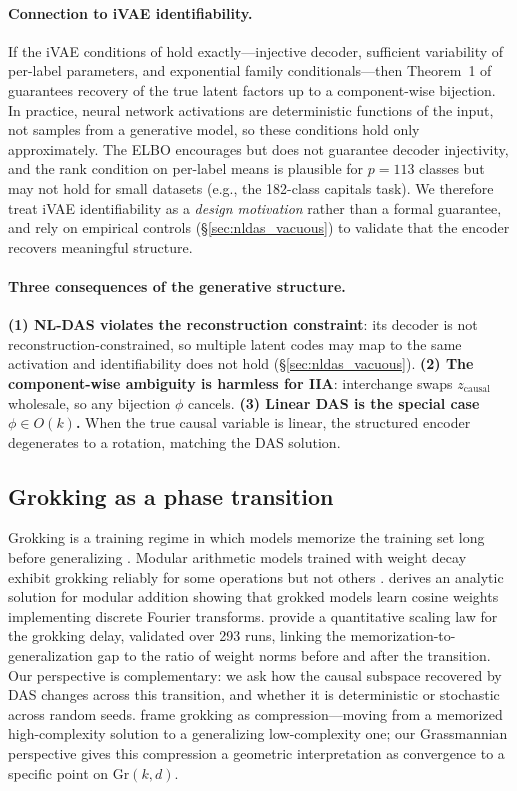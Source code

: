 \documentclass{article}
\newcommand{\Gr}{\mathrm{Gr}}
\begin{document}
\paragraph{Connection to iVAE identifiability.}
\label{prop:recovery}
If the iVAE conditions of \citet{khemakhem2020variational} hold exactly---injective
decoder, sufficient variability of per-label parameters, and exponential family
conditionals---then Theorem~1 of \citet{khemakhem2020variational} guarantees
recovery of the true latent factors up to a component-wise bijection. In
practice, neural network activations are deterministic functions of the input,
not samples from a generative model, so these conditions hold only
approximately. The ELBO encourages but does not guarantee decoder injectivity,
and the rank condition on per-label means is plausible for $p = 113$ classes
but may not hold for small datasets (e.g., the 182-class capitals task).
We therefore treat iVAE identifiability as a \emph{design motivation} rather
than a formal guarantee, and rely on empirical controls
(\S\ref{sec:nldas_vacuous}) to validate that the encoder recovers
meaningful structure.

\paragraph{Three consequences of the generative structure.}
\textbf{(1) NL-DAS violates the reconstruction constraint}:
its decoder is not reconstruction-constrained, so multiple latent codes may
map to the same activation and identifiability does not hold
(\S\ref{sec:nldas_vacuous}).
\textbf{(2) The component-wise ambiguity is harmless for IIA}:
interchange swaps $z_\text{causal}$ wholesale, so any bijection $\phi$ cancels.
\textbf{(3) Linear DAS is the special case $\phi \in O(k)$.}
When the true causal variable is linear, the structured encoder degenerates
to a rotation, matching the DAS solution.

\subsection{Grokking as a phase transition}

Grokking is a training regime in which models memorize the training set long
before generalizing \citep{power2022grokking}. Modular arithmetic models trained
with weight decay exhibit grokking reliably for some operations but not others
\citep{nanda2023progress, zhong2024clock}. \citet{gromov2023grokking} derives
an analytic solution for modular addition showing that grokked models learn
cosine weights implementing discrete Fourier transforms.
\citet{khanh2026scaling} provide a quantitative scaling law for the grokking
delay, validated over 293 runs, linking the memorization-to-generalization gap
to the ratio of weight norms before and after the transition.
Our perspective is complementary: we ask how the causal subspace recovered by
DAS changes across this transition, and whether it is deterministic or
stochastic across random seeds.
\citet{liu2023grokking} frame grokking as compression---moving from a memorized
high-complexity solution to a generalizing low-complexity one; our Grassmannian
perspective gives this compression a geometric interpretation as convergence to a
specific point on $\Gr(k,d)$.
\end{document}
